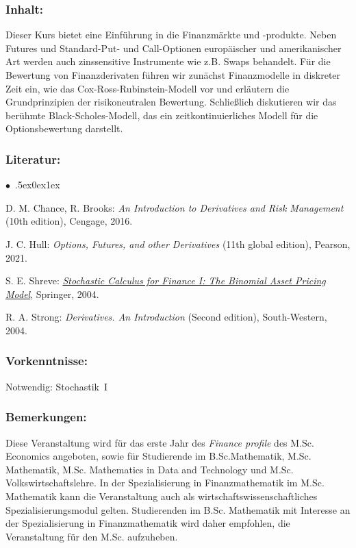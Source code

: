 \documentclass[a4paper,10pt]{article}
\renewenvironment{itemize}{\begin{list}{$\bullet$\ }{\itemsep.5ex\setlength{\topsep}{0.5\itemsep}\parsep0ex\labelsep1ex\settowidth{\labelwidth}{$\bullet$\ }\setlength{\leftmargin}{\labelwidth}\addtolength{\leftmargin}{3ex}\addtolength{\leftmargin}{\labelsep}}}{\end{list}}
\begin{document}
\subsubsection*{\large
    Inhalt:
}
Dieser Kurs bietet eine Einführung in die Finanzmärkte und -produkte. Neben Futures und Standard-Put- und Call-Optionen europäischer und amerikanischer Art werden auch zinssensitive Instrumente wie z.B. Swaps behandelt.
Für die Bewertung von Finanzderivaten führen wir zunächst Finanzmodelle in diskreter Zeit ein, wie das Cox-Ross-Rubinstein-Modell vor und erläutern die Grundprinzipien der risikoneutralen Bewertung. Schließlich diskutieren wir das berühmte Black-Scholes-Modell, das ein zeitkontinuierliches Modell für die Optionsbewertung darstellt.
\subsubsection*{\large
    Literatur:
}
\begin{itemize}
\item
D. M. Chance, R. Brooks: \emph{An Introduction to Derivatives and Risk Management} (10th edition), Cengage, 2016. 
\item
J. C. Hull: \emph{Options, Futures, and other Derivatives} (11th global edition), Pearson, 2021.
\item 
S. E. Shreve: \href{https://link.springer.com/book/10.1007/978-0-387-22527-2}{\emph{Stochastic Calculus for Finance I: The Binomial Asset Pricing Model}}, Springer, 2004. 
\item 
R. A. Strong: \emph{Derivatives. An Introduction} (Second edition), South-Western, 2004.
\end{itemize}
\subsubsection*{\large
    Vorkenntnisse:
}
Notwendig: Stochastik~I
\subsubsection*{\large
    Bemerkungen:
}
Diese Veranstaltung wird für das erste Jahr des {\em Finance profile} des M.Sc. Economics angeboten, sowie für Studierende im B.Sc.Mathematik, M.Sc. Mathematik, M.Sc. Mathematics in Data and Technology und M.Sc. Volkswirtschaftslehre. In der Spezialisierung in Finanzmathematik im M.Sc. Mathematik kann die Veranstaltung auch als wirtschaftswissenschaftliches Spezialisierungsmodul gelten. Studierenden im B.Sc. Mathematik mit Interesse an der Spezialisierung in Finanzmathematik wird daher empfohlen, die Veranstaltung für den M.Sc. aufzuheben.
\cleardoublepage
\end{document}
